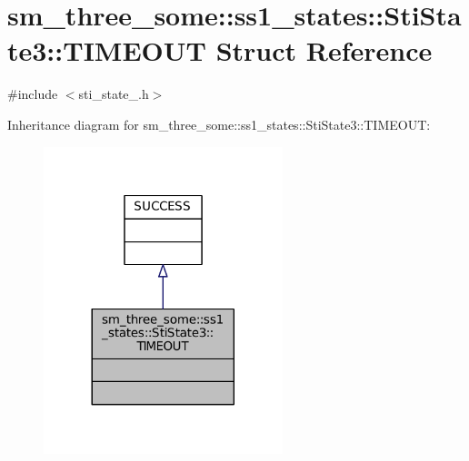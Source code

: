 \hypertarget{structsm__three__some_1_1ss1__states_1_1StiState3_1_1TIMEOUT}{}\section{sm\+\_\+three\+\_\+some\+:\+:ss1\+\_\+states\+:\+:Sti\+State3\+:\+:T\+I\+M\+E\+O\+UT Struct Reference}
\label{structsm__three__some_1_1ss1__states_1_1StiState3_1_1TIMEOUT}


{\ttfamily \#include $<$sti\+\_\+state\+\_.\+h$>$}



Inheritance diagram for sm\+\_\+three\+\_\+some\+:\+:ss1\+\_\+states\+:\+:Sti\+State3\+:\+:T\+I\+M\+E\+O\+UT\+:
\nopagebreak
\begin{figure}[H]
\begin{center}
\leavevmode
\includegraphics[width=197pt]{structsm__three__some_1_1ss1__states_1_1StiState3_1_1TIMEOUT__inherit__graph}
\end{center}
\end{figure}


